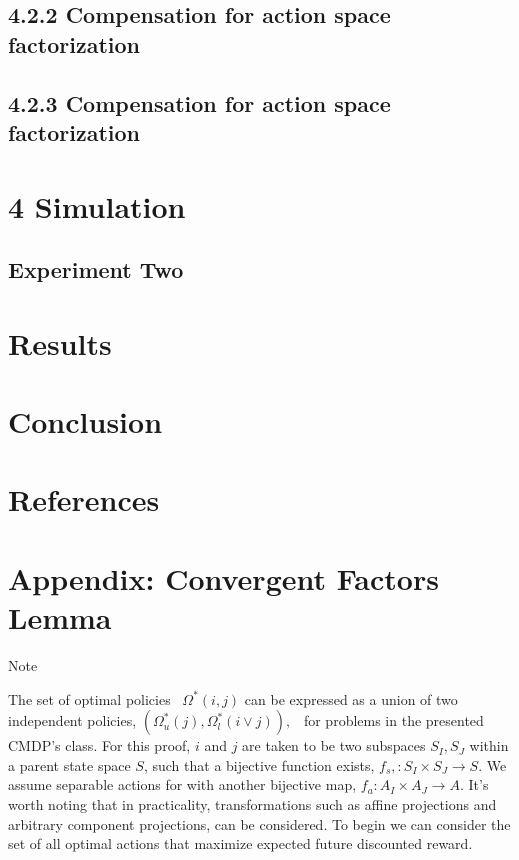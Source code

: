 \documentclass{article}
\begin{document}
\subsection{4.2.2 Compensation for action space factorization}

\bigskip

\subsection{4.2.3 Compensation for action space factorization}

\bigskip

\section{}
\section{4 Simulation}
\subsection{Experiment Two}
\section{Results}
\section{Conclusion}
\section{References}
\section{Appendix: Convergent Factors Lemma}
Note

The set of optimal policies \  $\Omega _{}^{\ast }\left(i,j\right)$ can be expressed as a union of two independent policies,  $\left(\Omega _u^{\ast }\left(j\right),\Omega _l^{\ast }\left(i\vee j\right)\right),$ \ for problems in the presented CMDP's class. For this proof,  $i$ and  $j$ are taken to be two subspaces  $S_I,S_J$ within a parent state space  $S$, such that a bijective function exists,  $f_s,:S_I\times S_J\rightarrow \mathit{S.}$ We assume separable actions for with another bijective map,  $f_a:A_I\times A_J\rightarrow A$. It's worth noting that in practicality, transformations such as affine projections and arbitrary component projections, can be considered. To begin we can consider the set of all optimal actions that maximize expected future discounted reward.
\end{document}
